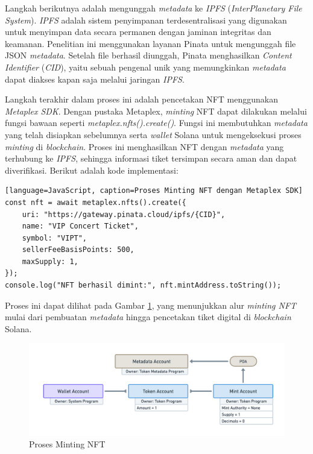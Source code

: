 Langkah berikutnya adalah mengunggah \textit{metadata} ke \textit{IPFS} (\textit{InterPlanetary File System}). \textit{IPFS} adalah sistem penyimpanan terdesentralisasi yang digunakan untuk menyimpan data secara permanen dengan jaminan integritas dan keamanan. Penelitian ini menggunakan layanan Pinata untuk mengunggah file JSON \textit{metadata}. Setelah file berhasil diunggah, Pinata menghasilkan \textit{Content Identifier} (\textit{CID}), yaitu sebuah pengenal unik yang memungkinkan \textit{metadata} dapat diakses kapan saja melalui jaringan \textit{IPFS}.

Langkah terakhir dalam proses ini adalah pencetakan NFT menggunakan \textit{Metaplex SDK}. Dengan pustaka Metaplex, \textit{minting} NFT dapat dilakukan melalui fungsi bawaan seperti \textit{metaplex.nfts().create()}. Fungsi ini membutuhkan \textit{metadata} yang telah disiapkan sebelumnya serta \textit{wallet} Solana untuk mengeksekusi proses \textit{minting} di \textit{blockchain}. Proses ini menghasilkan NFT dengan \textit{metadata} yang terhubung ke \textit{IPFS}, sehingga informasi tiket tersimpan secara aman dan dapat diverifikasi. Berikut adalah kode implementasi:

\begin{verbatim}[language=JavaScript, caption=Proses Minting NFT dengan Metaplex SDK]
const nft = await metaplex.nfts().create({
    uri: "https://gateway.pinata.cloud/ipfs/{CID}",
    name: "VIP Concert Ticket",
    symbol: "VIPT",
    sellerFeeBasisPoints: 500,
    maxSupply: 1,
});
console.log("NFT berhasil dimint:", nft.mintAddress.toString());
\end{verbatim}

Proses ini dapat dilihat pada Gambar \ref{fig:minting-nft}, yang menunjukkan alur \textit{minting NFT} mulai dari pembuatan \textit{metadata} hingga pencetakan tiket digital di \textit{blockchain} Solana.

\begin{figure}[H]
    \centering
    \includegraphics[scale=0.3]{gambar/3.2.2.png}
    \caption{Proses Minting NFT}
    \label{fig:minting-nft}
\end{figure}

